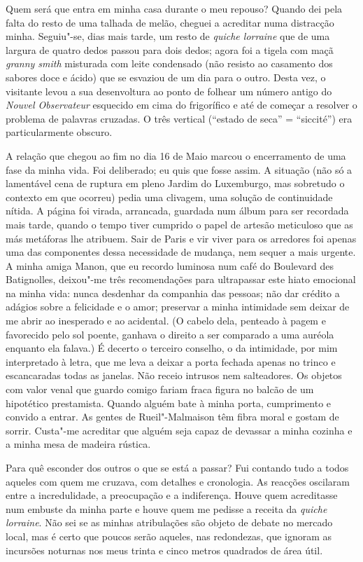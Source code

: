 Quem será que entra em minha casa durante o meu repouso? Quando dei
pela falta do resto de uma talhada de melão, cheguei a acreditar numa
distracção minha. Seguiu"-se, dias mais tarde, um resto de \emph{quiche lorraine }que de uma
largura de quatro dedos passou para dois dedos; agora foi a tigela com
maçã \emph{granny smith }misturada com leite condensado (não resisto ao
casamento dos sabores doce e ácido) que se esvaziou de um dia para o
outro. Desta vez, o visitante levou a sua desenvoltura ao ponto de
folhear um número antigo do \emph{Nouvel Observateur }esquecido em cima
do frigorífico e até de começar a resolver o problema de palavras
cruzadas. O três vertical (``estado de seca'' = ``siccité'') era
particularmente obscuro.

A relação que chegou ao fim no dia 16 de Maio marcou o encerramento de
uma fase da minha vida. Foi deliberado; eu quis que fosse assim. A
situação (não só a lamentável cena de ruptura em pleno Jardim do
Luxemburgo, mas sobretudo o contexto em que ocorreu) pedia uma clivagem,
uma solução de continuidade nítida. A página foi virada, arrancada,
guardada num álbum para ser recordada mais tarde, quando o tempo tiver
cumprido o papel de artesão meticuloso que as más metáforas lhe
atribuem. Sair de Paris e vir viver para os arredores foi apenas uma das
componentes dessa necessidade de mudança, nem sequer a mais urgente. A
minha amiga Manon, que eu recordo luminosa num café do Boulevard des
Batignolles, deixou"-me três recomendações para ultrapassar este hiato
emocional na minha vida: nunca desdenhar da companhia das pessoas; não
dar crédito a adágios sobre a felicidade e o amor; preservar a minha
intimidade sem deixar de
me abrir ao inesperado e ao acidental. (O cabelo dela, penteado à
pagem e favorecido pelo sol poente, ganhava o direito a ser comparado a
uma auréola enquanto ela falava.) É decerto o terceiro conselho, o da
intimidade, por mim interpretado à letra, que me leva a deixar a porta
fechada apenas no trinco e escancaradas todas as janelas. Não receio
intrusos nem salteadores. Os objetos com valor venal que guardo
comigo fariam fraca figura no balcão de um hipotético prestamista.
Quando alguém bate à minha porta, cumprimento e convido a entrar. As
gentes de Rueil"-Malmaison têm fibra moral e gostam de sorrir. Custa"-me
acreditar que alguém seja capaz de devassar a minha cozinha e a minha
mesa de madeira rústica.

Para quê esconder dos outros o que se está a passar? Fui contando tudo a
todos aqueles com quem me cruzava, com detalhes e cronologia. As
reacções oscilaram entre a incredulidade, a preocupação e a
indiferença. Houve quem acreditasse num embuste da minha parte e houve
quem me pedisse a receita da \emph{quiche lorraine}. Não sei se as
minhas atribulações são objeto de debate no mercado local, mas é certo
que poucos serão aqueles, nas redondezas, que ignoram as incursões
noturnas nos meus trinta e cinco metros quadrados de área útil.


